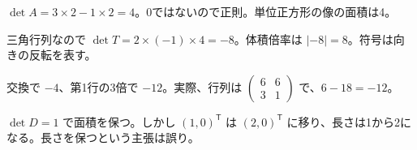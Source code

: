 \documentclass[11pt]{article}
\begin{document}

\problem[2×2の計算]
\begin{ans}
$\det A=3\times2-1\times2=4$。0ではないので正則。単位正方形の像の面積は4。
\end{ans}

\problem[三角行列]
\begin{ans}
三角行列なので $\det T=2\times(-1)\times4=-8$。体積倍率は $|-8|=8$。符号は向きの反転を表す。
\end{ans}
\newpage

\problem[行操作]
\begin{ans}
交換で $-4$、第1行の3倍で $-12$。実際、行列は $\begin{pmatrix}6&6\\3&1\end{pmatrix}$ で、$6-18=-12$。
\end{ans}

\problem[面積と形]
\begin{ans}
$\det D=1$ で面積を保つ。しかし $(1,0)^{\mathsf T}$ は $(2,0)^{\mathsf T}$ に移り、長さは1から2になる。長さを保つという主張は誤り。
\end{ans}
\end{document}
